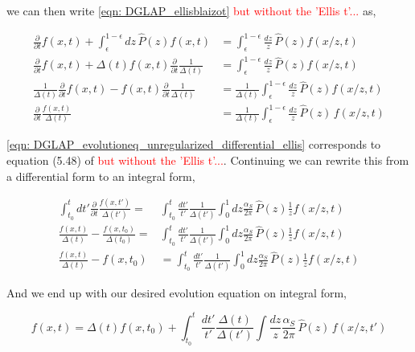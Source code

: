 \documentclass[main.tex]{subfiles}
\begin{document}
we can then write \autoref{eqn: DGLAP_ellisblaizot} \textcolor{red}{but without the 'Ellis t'...} as, 

\begin{align}\label{eqn: DGLAP_evolutioneq_unregularized_differential_ellis}
    \frac{\partial}{\partial t} f(x,t) + \int_{\epsilon}^{1-\epsilon} dz \, \hat{P}(z) f(x,t) &= \int_{\epsilon}^{1-\epsilon} \frac{dz}{z} \, \hat{P}(z) f(x/z ,t) \nonumber \\
    \frac{\partial}{\partial t} f(x,t) + \Delta(t) f(x,t) \frac{\partial}{\partial t} \frac{1}{\Delta(t)} &= \int_{\epsilon}^{1-\epsilon} \frac{dz}{z} \, \hat{P}(z) f(x/z ,t) \nonumber \\
    \frac{1}{\Delta(t)} \frac{\partial}{\partial t} f(x,t) - f(x,t) \frac{\partial}{\partial t} \frac{1}{\Delta(t)} &= \frac{1}{\Delta(t)} \int_{\epsilon}^{1-\epsilon} \frac{dz}{z} \, \hat{P}(z) f(x/z ,t) \nonumber \\
    \frac{\partial }{\partial t} \frac{f(x,t)}{\Delta (t)} &= \frac{1}{\Delta(t)} \int_{\epsilon}^{1-\epsilon} \frac{dz}{z} \, \hat P(z) \, f(x/z, t)
\end{align}


\autoref{eqn: DGLAP_evolutioneq_unregularized_differential_ellis} corresponds to equation (5.48) of \cite{ellis_stirling_webber_1996} \textcolor{red}{but without the 'Ellis t'...}. Continuing we can rewrite this from a differential form to an integral form,

\begin{align}
    \int_{t_0}^t dt' \frac{\partial}{\partial t} \frac{f(x,t')}{\Delta(t')} = &\int_{t_0}^{t} \frac{dt'}{t'} \frac{1}{\Delta(t')} \int_0^1 dz \frac{\alpha_S}{2\pi} \, \hat{P}(z) \frac{1}{z} f(x/z, t) \nonumber\\
    \frac{f(x,t)}{\Delta(t)} - \frac{f(x,t_0)}{\Delta(t_0)} = &\int_{t_0}^{t} \frac{dt'}{t'} \frac{1}{\Delta(t')} \int_0^1 dz \frac{\alpha_S}{2\pi} \, \hat{P}(z) \frac{1}{z} f(x/z, t) \nonumber\\
    \frac{f(x,t)}{\Delta(t)} - f(x,t_0) &= \int_{t_0}^{t} \frac{dt'}{t'} \frac{1}{\Delta(t')} \int_0^1 dz \frac{\alpha_S}{2\pi} \, \hat{P}(z) \frac{1}{z} f(x/z, t)
\end{align}

And we end up with our desired evolution equation on integral form, 

\begin{equation}\label{eqn: DGLAP_evolutioneq_unregularized_integral_ellis}
    f(x,t) =  \Delta(t) f(x,t_0) + \int_{t_0}^{t} \frac{dt'}{t'} \frac{\Delta(t)}{\Delta(t')} \int \frac{dz}{z} \frac{\alpha_S}{2\pi} \, \hat{P}(z) \, f(x/z, t')
\end{equation}
\end{document}
